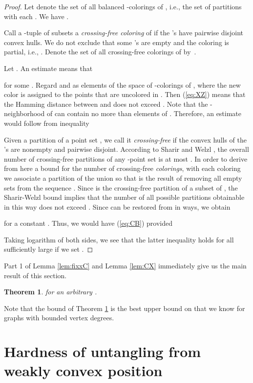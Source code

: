 \documentclass[reqno,12pt]{amsart}
\newtheorem{theorem}{Theorem}[section]
\newcommand{\refeq}[1]{(\ref{eq:#1})}
\begin{document}
\begin{proof}
Let  denote the set of all balanced -colorings of , i.e.,
the set of partitions  with each .
We have .

Call a -tuple of subsets  a \emph{crossing-free
coloring} of  if the 's have pairwise disjoint convex hulls.
We do not exclude that some 's are empty and the coloring is partial, i.e.,
. Denote the set of all crossing-free colorings of 
by~.

Let . An estimate  means that

for some . Regard  and  as elements of the space
 of -colorings of , where the new color  is
assigned to the points that are uncolored in . Then \refeq{XZ} means
that the Hamming distance between  and  does not exceed .
Note that the -neighborhood of  can contain no more than 
 elements of . Therefore, an estimate 
would follow from inequality


Given a partition  of a point set ,
we call it \emph{crossing-free} if the
convex hulls of the 's are nonempty and pairwise disjoint. 
According to Sharir and Welzl \cite[Theorem 5.2]{ShW},
the overall number of crossing-free partitions of any -point set
 is at most .
In order to derive from here a bound for the number of
crossing-free \emph{colorings}, with each coloring 
we associate a partition  of the union 
so that 
is the result of removing all empty sets from the sequence .
Since  is the crossing-free partition of a subset of ,
the Sharir-Welzl bound implies that the number of all possible partitions 
obtainable in this way does not exceed .
Since  can be restored from  in
 ways, we obtain

for a constant . Thus, we would have \refeq{CB} provided

Taking logarithm of both sides, we see that the latter inequality
holds for all sufficiently large  if we set .
\end{proof}

Part 1 of Lemma \ref{lem:fixxC} and Lemma \ref{lem:CX} immediately give us
the main result of this section.

\begin{theorem}\label{thm:FIXHn}
 for an arbitrary .
\end{theorem}

\noindent
Note that the bound of Theorem \ref{thm:FIXHn} is the best upper bound on
 that we know for graphs with bounded vertex degrees.


\section{Hardness of untangling from weakly convex position}\label{s:weak}
\end{document}

